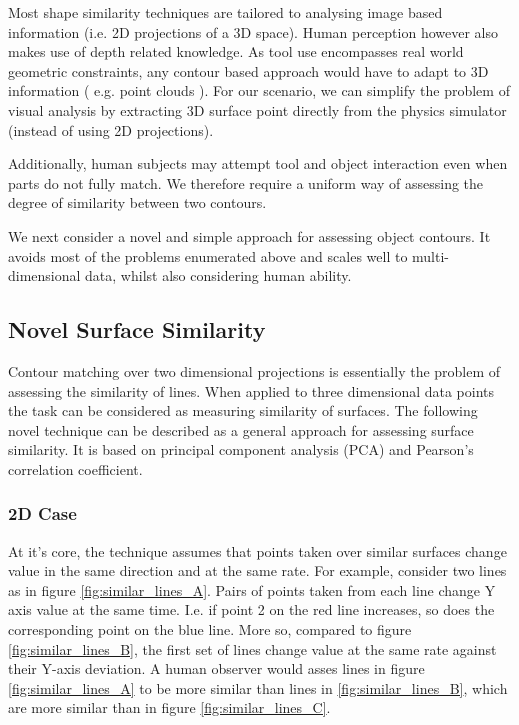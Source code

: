 \documentclass[
    floatsintext
]{article}
\begin{document}
Most shape similarity techniques are tailored to analysing image based information (i.e. 2D projections of a 3D space).
Human perception however also makes use of depth related knowledge.
As tool use encompasses real world geometric constraints, any contour based approach would have to adapt to 3D information ( e.g. point clouds ).
For our scenario, we can simplify the problem of visual analysis by extracting 3D surface point directly from the physics simulator (instead of using 2D projections). 

Additionally, human subjects may attempt tool and object interaction even when parts do not fully match. 
We therefore require a uniform way of assessing the degree of similarity between two contours. 

We next consider a novel and simple approach for assessing object contours.
It avoids most of the problems enumerated above and scales well to multi-dimensional data, whilst also considering human ability.  

\pagebreak[0]
\subsection{Novel Surface Similarity}
Contour matching over two dimensional projections is essentially the problem of assessing the similarity of lines.  
When applied to three dimensional data points the task can be considered as measuring similarity of surfaces.  
The following novel technique can be described as a general approach for assessing surface similarity. 
It is based on principal component analysis (PCA) and Pearson's correlation coefficient. 

\subsubsection{2D Case}
At it's core, the technique assumes that points taken over similar surfaces change value in the same direction and at the same rate. 
For example, consider two lines as in figure \ref{fig:similar_lines_A}. Pairs of points taken from each line change Y axis value at the same time. 
I.e. if point 2 on the red line increases, so does the corresponding point on the blue line.   
More so, compared to figure \ref{fig:similar_lines_B}, the first set of lines change value at the same rate against their Y-axis deviation.
A human observer would asses lines in figure \ref{fig:similar_lines_A} to be more similar than lines in \ref{fig:similar_lines_B},
which are more similar than in figure \ref{fig:similar_lines_C}.
\end{document}
